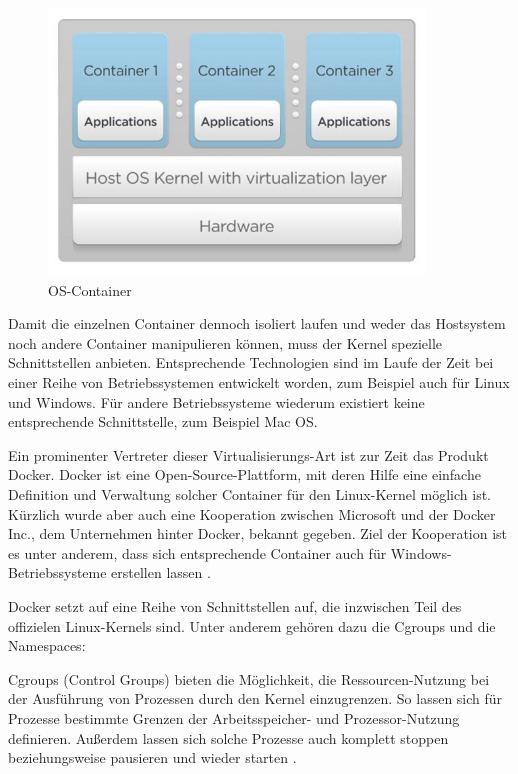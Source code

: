 \begin{figure}[!ht]
  \begin{center}
    \includegraphics[width=10cm]{bilder/lxc-architecture.jpg}
    \caption{OS-Container \citep{Francis2014}}
  \end{center}
\end{figure}

Damit die einzelnen Container dennoch isoliert laufen und weder das Hostsystem noch andere Container manipulieren können, muss der Kernel spezielle Schnittstellen anbieten. Entsprechende Technologien sind im Laufe der Zeit bei einer Reihe von Betriebssystemen entwickelt worden, zum Beispiel auch für Linux und Windows. Für andere Betriebssysteme wiederum existiert keine entsprechende Schnittstelle, zum Beispiel Mac OS.

Ein prominenter Vertreter dieser Virtualisierungs-Art ist zur Zeit das Produkt Docker. Docker ist eine Open-Source-Plattform, mit deren Hilfe eine einfache Definition und Verwaltung solcher Container für den Linux-Kernel möglich ist. Kürzlich wurde aber auch eine Kooperation zwischen Microsoft und der Docker Inc., dem Unternehmen hinter Docker, bekannt gegeben. Ziel der Kooperation ist es unter anderem, dass sich entsprechende Container auch für Windows-Betriebssysteme erstellen lassen \citep[Vgl.][]{heise:001}.

Docker setzt auf eine Reihe von Schnittstellen auf, die inzwischen Teil des offizielen Linux-Kernels sind. Unter anderem gehören dazu die Cgroups und die Namespaces:

Cgroups (Control Groups) bieten die Möglichkeit, die Ressourcen-Nutzung bei der Ausführung von Prozessen durch den Kernel einzugrenzen. So lassen sich für Prozesse bestimmte Grenzen der Arbeitsspeicher- und Prozessor-Nutzung definieren. Außerdem lassen sich solche Prozesse auch komplett stoppen beziehungsweise pausieren und wieder starten \citep[Vgl.][S. 3]{Schee14}.

